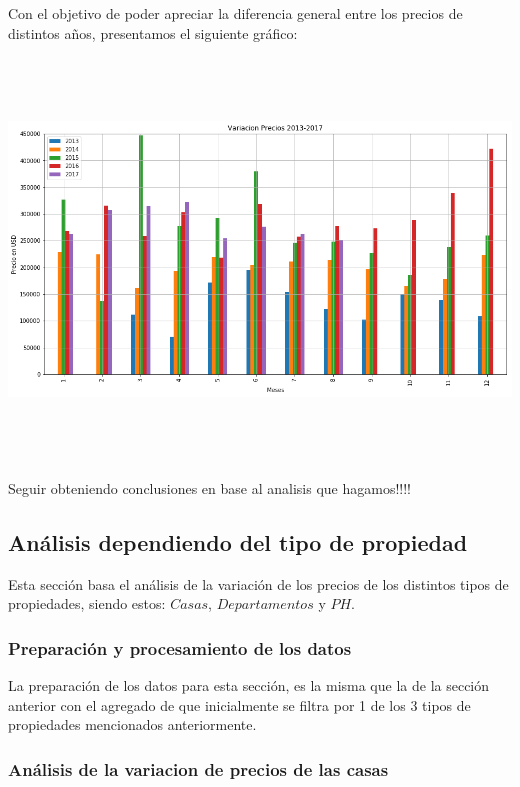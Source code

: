 \documentclass[a4paper, 10pt]{article}
\def\code#1{\texttt{#1}}
\newcommand\tab[1][0.5cm]{\hspace*{#1}}
\begin{document}
      Con el objetivo de poder apreciar la diferencia general entre los precios de distintos años, presentamos el siguiente gráfico:

      \begin{center}
            \includegraphics[width=6in, height=4.2in]{images/comparacionAnual}
      \end{center}

      Seguir obteniendo conclusiones en base al analisis que hagamos!!!!

      \subsection{Análisis dependiendo del tipo de propiedad}
      \tab Esta sección basa el análisis de la variación de los precios de los distintos tipos de propiedades, siendo estos: \code{$Casas$}, \code{$Departamentos$} y \code{$PH$}.

      \subsubsection{Preparación y procesamiento de los datos}
      La preparación de los datos para esta sección, es la misma que la de la sección anterior con el agregado de que inicialmente se filtra por 1 de los 3 tipos de propiedades mencionados anteriormente.

      \subsubsection{Análisis de la variacion de precios de las casas}
\end{document}
